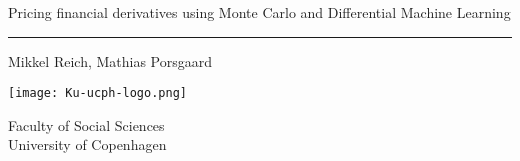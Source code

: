 \begin{titlepage}
    \begin{center}
        \vspace*{1cm}
            
        \Huge
        Pricing financial derivatives using Monte Carlo and Differential Machine Learning

        \hrule
        \vspace{-1.0cm}
        \LARGE
        
            
        \vspace{1.5cm}
            
        Mikkel Reich, Mathias Porsgaard
            
        \vfill
            
        \vspace{0.8cm}
            
        \texttt{[image: Ku-ucph-logo.png]}
            
        \Large
        Faculty of Social Sciences\\
        University of Copenhagen
            
    \end{center}
\end{titlepage}